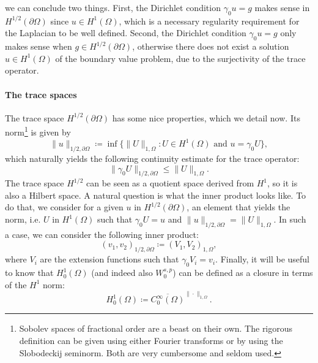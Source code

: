 we can conclude two things. First, the Dirichlet condition $\gamma_0 u = g$ makes sense in $H^{1/2}(\partial\Omega)$ since $u\in H^1(\Omega)$, which is a necessary regularity requirement for the Laplacian to be well defined. Second, the Dirichlet condition $\gamma_0 u = g$ only makes sense when $g\in H^{1/2}(\partial\Omega)$, otherwise there does not exist a solution $u\in H^1(\Omega)$ of the boundary value problem, due to the surjectivity of the trace operator. %
\paragraph{The trace spaces} The trace space $H^{1/2}(\partial\Omega)$ has some nice properties, which we detail now. Its norm\footnote{Sobolev spaces of fractional order are a beast on their own. The rigorous definition can be given using either Fourier transforms or by using the Slobodeckij seminorm. Both are very cumbersome and seldom used.} is given by 
\begin{equation}\label{eq:norm-trace-1/2}
    \| u \|_{1/2,\partial\Omega} \coloneqq \inf\{\|U\|_{1,\Omega}: U \in H^1(\Omega) \text{ and } u = \gamma_0 U\},
\end{equation}
which naturally yields the following continuity estimate for the trace operator: 
\begin{equation}
    \| \gamma_0 U\|_{1/2,\partial\Omega} \leq \| U \|_{1,\Omega} .
\end{equation}
The trace space $H^{1/2}$ can be seen as a quotient space derived from $H^1$, so it is also a Hilbert space. A natural question is what the inner product looks like. To do that, we consider for a given $u$ in $H^{1/2}(\partial\Omega)$, an element that yields the norm, i.e. $U$ in $H^1(\Omega)$ such that $\gamma_0 U = u$ and $\| u \|_{1/2,\partial\Omega} = \| U \|_{1,\Omega}$. In such a case, we can consider the following inner product: 
\begin{equation}\label{eq:inner-product-trace-1/2}
    (v_1, v_2)_{1/2,\partial\Omega} \coloneqq (V_1, V_2)_{1,\Omega},
\end{equation}
where $V_i$ are the extension functions such that $\gamma_0 V_i = v_i$. Finally, it will be useful to know that $H_0^1(\Omega)$ (and indeed also $W_0^{s,p}$) can be defined as a closure in terms of the $H^1$ norm: 
\begin{equation}\label{eq:def-H01-closure}
    H_0^1(\Omega) \coloneqq \overline{C_0^\infty(\Omega)}^{\|\cdot \|_{1,\Omega}}.
\end{equation}
